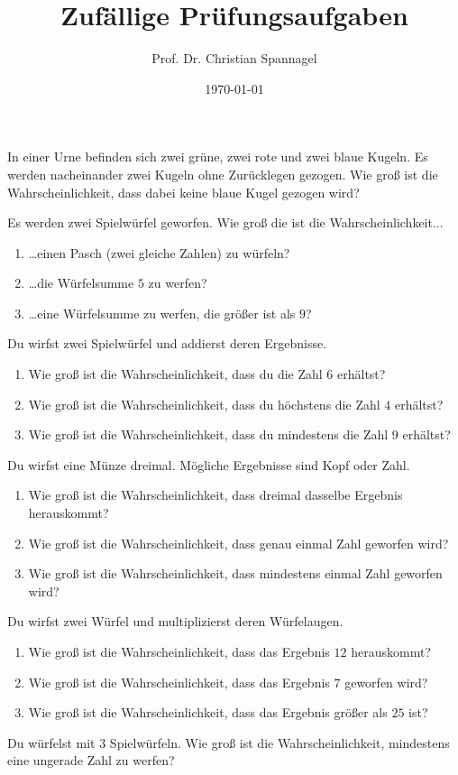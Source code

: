 \documentclass{cssheet}
\title{Zufällige Prüfungsaufgaben}
\author{Prof. Dr. Christian Spannagel}
\date{\today}
\begin{document}
\printtitle

\begin{aufgabe}[WiSe 16/17]
	In einer Urne befinden sich zwei grüne, zwei rote und zwei blaue Kugeln. Es werden nacheinander zwei Kugeln ohne Zurücklegen gezogen. Wie groß ist die Wahrscheinlichkeit, dass dabei keine blaue Kugel gezogen wird?
\end{aufgabe}

\begin{aufgabe}[SoSe 17]
	Es werden zwei Spielwürfel geworfen. Wie groß die ist die Wahrscheinlichkeit...
	\begin{enumerate}
		\item \dots einen Pasch (zwei gleiche Zahlen) zu würfeln?
		\item \dots die Würfelsumme $5$ zu werfen?
		\item \dots eine Würfelsumme zu werfen, die größer ist als $9$?
	\end{enumerate}
\end{aufgabe}

\begin{aufgabe}[SoSe 23]
	Du wirfst zwei Spielwürfel und addierst deren Ergebnisse.
	\begin{enumerate}
		\item Wie groß ist die Wahrscheinlichkeit, dass du die Zahl $6$ erhältst?
		\item Wie groß ist die Wahrscheinlichkeit, dass du höchstens die Zahl $4$ erhältst?
		\item Wie groß ist die Wahrscheinlichkeit, dass du mindestens die Zahl $9$ erhältst?
	\end{enumerate}
\end{aufgabe}

\begin{aufgabe}[WiSe 23/24]
	Du wirfst eine Münze dreimal. Mögliche Ergebnisse sind Kopf oder Zahl.
	\begin{enumerate}
		\item Wie groß ist die Wahrscheinlichkeit, dass dreimal dasselbe Ergebnis herauskommt?
		\item Wie groß ist die Wahrscheinlichkeit, dass genau einmal Zahl geworfen wird?
		\item Wie groß ist die Wahrscheinlichkeit, dass mindestens einmal Zahl geworfen wird?
	\end{enumerate}
\end{aufgabe}

\begin{aufgabe}[SoSe 24]
	Du wirfst zwei Würfel und multiplizierst deren Würfelaugen.
	\begin{enumerate}
		\item Wie groß ist die Wahrscheinlichkeit, dass das Ergebnis $12$ herauskommt?
		\item Wie groß ist die Wahrscheinlichkeit, dass das Ergebnis $7$ geworfen wird?
		\item Wie groß ist die Wahrscheinlichkeit, dass das Ergebnis größer als $25$ ist?
	\end{enumerate}
\end{aufgabe}

\begin{aufgabe}[WiSe 24/25]
	Du würfelst mit 3 Spielwürfeln. Wie groß ist die Wahrscheinlichkeit, mindestens eine ungerade Zahl zu werfen?
\end{aufgabe}


\vspace*{10mm}
\printlicense

\printsocials
\end{document}
